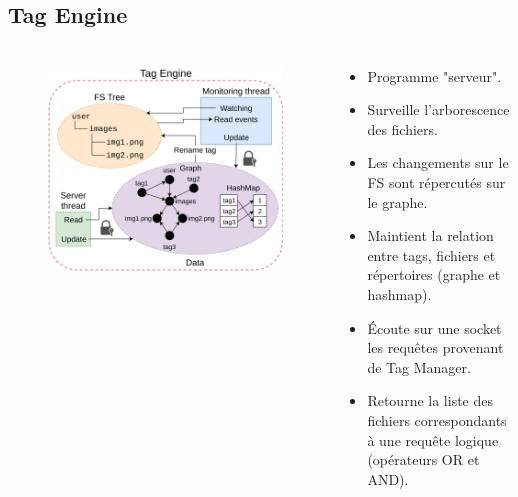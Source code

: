 \documentclass[10pt]{beamer}
\begin{document}
\subsection{Tag Engine}
\begin{frame}
    \frametitle{\subsecname}
    \begin{columns}[T]
        \begin{column}{.6\textwidth}
            \begin{figure}
                \begin{center}
                    \includegraphics[width=1\textwidth]{images/tag_engine2.png}
                \end{center}
            \end{figure}
        \end{column}
        \pause
        \begin{column}{.4\textwidth}
        \fontsize{8pt}{9}\selectfont
            \begin{itemize}
                \item Programme "serveur".
                \item Surveille l'arborescence des fichiers.
                \item Les changements sur le FS sont répercutés sur le graphe.
                \item Maintient la relation entre tags, fichiers et répertoires (graphe et hashmap).
                \item Écoute sur une socket les requêtes provenant de Tag Manager.
                \item Retourne la liste des fichiers correspondants à une requête logique (opérateurs OR et AND).
            \end{itemize}
        \end{column}
    \end{columns}
\end{frame}
\end{document}
